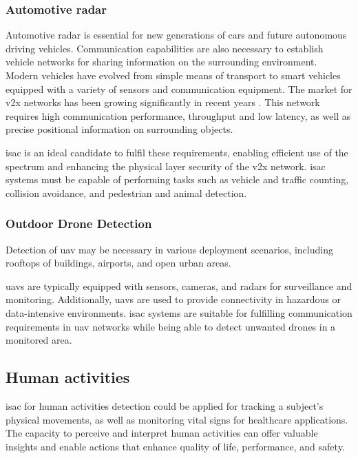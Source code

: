 	\subsubsection{Automotive radar}
	
	Automotive radar is essential for new generations of cars and future autonomous driving vehicles.
	Communication capabilities are also necessary to establish vehicle networks for sharing information on the surrounding environment.
	Modern vehicles have evolved from simple means of transport to smart vehicles equipped with a variety of sensors and communication equipment.
	The market for \gls{v2x} networks has been growing significantly in recent years \cite{Liu_Masouros_2021}.
	This network requires high communication performance, throughput and low latency, as well as precise positional information on surrounding objects.
	
	\gls{isac} is an ideal candidate to fulfil these requirements, enabling efficient use of the spectrum and enhancing the physical layer security of the \gls{v2x} network.
	\gls{isac} systems must be capable of performing tasks such as vehicle and traffic counting, collision avoidance, and pedestrian and animal detection.
	
	\subsubsection{Outdoor Drone Detection}
	
	Detection of \gls{uav} may be necessary in various deployment scenarios, including rooftops of buildings, airports, and open urban areas.
	
	\glspl{uav} are typically equipped with sensors, cameras, and radars for surveillance and monitoring. Additionally, \glspl{uav} are used to provide connectivity in hazardous or data-intensive environments.
	\gls{isac} systems are suitable for fulfilling communication requirements in \gls{uav} networks while being able to detect unwanted drones in a monitored area.
	
	\subsection{Human activities}
	
	\Gls{isac} for human activities detection could be applied for tracking a subject's physical movements, as well as monitoring vital signs for healthcare applications. 
	The capacity to perceive and interpret human activities can offer valuable insights and enable actions that enhance quality of life, performance, and safety.
	
